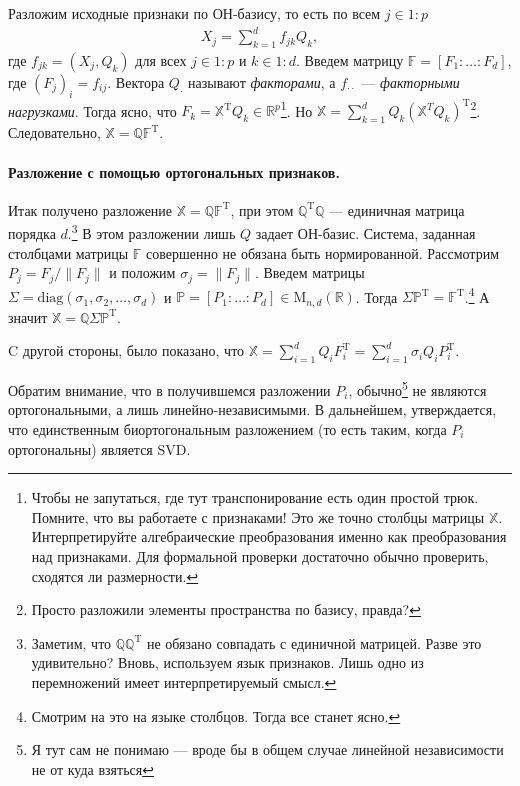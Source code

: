 Разложим исходные признаки по ОН-базису, то есть по всем $j \in 1:p$
\begin{gather*}
    X_j = \sum_{k=1}^d f_{jk} Q_k,
\end{gather*}
где $f_{jk} = (X_j, Q_k)$ для всех $j \in 1:p$ и $k \in 1:d$.
Введем матрицу $\mathbb F = [F_1 \colon \ldots \colon F_d]$, где $\left(F_j\right)_i = f_{ij}$. Вектора $Q_\cdot$ называют \textit{факторами},
а $f_{\cdot \cdot}$ --- \textit{факторными нагрузками}.
Тогда ясно, что $F_k = \mathbb X^\mathrm T Q_k \in \mathbb R^p$\footnote{Чтобы не запутаться, где тут транспонирование есть один простой трюк.
    Помните, что вы работаете с признаками! Это же точно столбцы матрицы $\mathbb X$. Интерпретируйте алгебраические преобразования именно как преобразования над
    признаками. Для формальной проверки достаточно обычно проверить, сходятся ли размерности.}.
    Но $\mathbb X = \sum_{k=1}^d Q_k (\mathbb X^T Q_k)^\mathrm T$\footnote{Просто разложили элементы пространства по базису, правда?}.
Следовательно, $\mathbb X = \mathbb Q \mathbb F^\mathrm T$.

\paragraph{Разложение с помощью ортогональных признаков.}
Итак получено разложение $\mathbb X = \mathbb Q \mathbb F^\mathrm T$, при этом $\mathbb Q^\mathrm T \mathbb Q$ --- единичная матрица порядка $d$.\footnote{Заметим,
    что $\mathbb Q \mathbb Q^\mathrm T$ не обязано совпадать с единичной матрицей. Разве это удивительно? Вновь, используем язык признаков.
    Лишь одно из перемножений имеет интерпретируемый смысл.}
В этом разложении лишь $Q$ задает ОН-базис. Система, заданная столбцами матрицы $\mathbb F$ совершенно не обязана быть нормированной.
Рассмотрим $P_j = F_j / \|F_j\|$ и положим $\sigma_j = \|F_j\|$. Введем матрицы $\Sigma = \mathrm {diag} (\sigma_1, \sigma_2, \ldots, \sigma_d)$ и
$\mathbb P = [P_1 \colon \ldots \colon P_d] \in \mathrm M_{n, d}(\mathbb R)$.
Тогда $\Sigma \mathbb P^\mathrm T = \mathbb F^\mathrm T$.\footnote{Смотрим на это на языке столбцов. Тогда все станет ясно.} 
А значит $\mathbb X = \mathbb Q \Sigma \mathbb P^\mathrm T$.

C другой стороны, было показано, что $\mathbb X = \sum_{i=1}^d Q_i F_i^\mathrm T = \sum_{i=1}^d \sigma_i Q_i P_i^\mathrm T$.

\bigskip

Обратим внимание, что в получившемся разложении $P_i$, обычно\footnote{\color{blue} Я тут сам не понимаю --- вроде бы в общем случае линейной независимости не от куда взяться}
не являются ортогональными, а лишь линейно-независимыми. В дальнейшем, утверждается, что единственным биортогональным разложением (то есть таким, когда $P_i$ ортогональны) является SVD.

